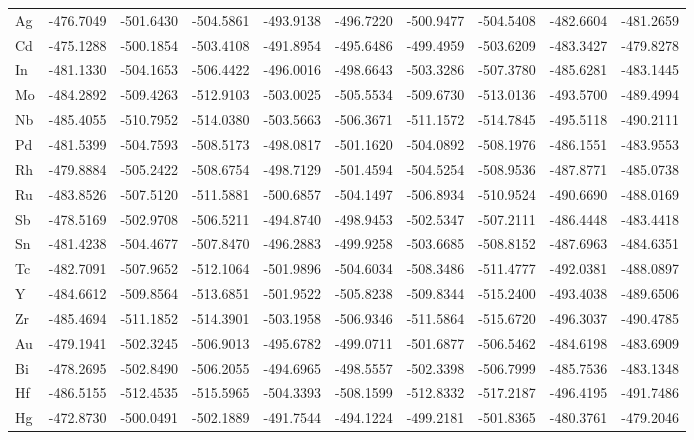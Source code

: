 \begin{table}[htbp]
{\begin{tabular}{l *{9}{l}}
      Ag & -476.7049 & -501.6430 & -504.5861 & -493.9138 & -496.7220 & -500.9477 & -504.5408 & -482.6604 & -481.2659 \\
      Cd & -475.1288 & -500.1854 & -503.4108 & -491.8954 & -495.6486 & -499.4959 & -503.6209 & -483.3427 & -479.8278 \\
      In & -481.1330 & -504.1653 & -506.4422 & -496.0016 & -498.6643 & -503.3286 & -507.3780 & -485.6281 & -483.1445 \\
      Mo & -484.2892 & -509.4263 & -512.9103 & -503.0025 & -505.5534 & -509.6730 & -513.0136 & -493.5700 & -489.4994 \\
      Nb & -485.4055 & -510.7952 & -514.0380 & -503.5663 & -506.3671 & -511.1572 & -514.7845 & -495.5118 & -490.2111 \\
      Pd & -481.5399 & -504.7593 & -508.5173 & -498.0817 & -501.1620 & -504.0892 & -508.1976 & -486.1551 & -483.9553 \\
      Rh & -479.8884 & -505.2422 & -508.6754 & -498.7129 & -501.4594 & -504.5254 & -508.9536 & -487.8771 & -485.0738 \\
      Ru & -483.8526 & -507.5120 & -511.5881 & -500.6857 & -504.1497 & -506.8934 & -510.9524 & -490.6690 & -488.0169 \\
      Sb & -478.5169 & -502.9708 & -506.5211 & -494.8740 & -498.9453 & -502.5347 & -507.2111 & -486.4448 & -483.4418 \\
      Sn & -481.4238 & -504.4677 & -507.8470 & -496.2883 & -499.9258 & -503.6685 & -508.8152 & -487.6963 & -484.6351 \\
      Tc & -482.7091 & -507.9652 & -512.1064 & -501.9896 & -504.6034 & -508.3486 & -511.4777 & -492.0381 & -488.0897 \\
      Y  & -484.6612 & -509.8564 & -513.6851 & -501.9522 & -505.8238 & -509.8344 & -515.2400 & -493.4038 & -489.6506 \\
      Zr & -485.4694 & -511.1852 & -514.3901 & -503.1958 & -506.9346 & -511.5864 & -515.6720 & -496.3037 & -490.4785 \\
      Au & -479.1941 & -502.3245 & -506.9013 & -495.6782 & -499.0711 & -501.6877 & -506.5462 & -484.6198 & -483.6909 \\
      Bi & -478.2695 & -502.8490 & -506.2055 & -494.6965 & -498.5557 & -502.3398 & -506.7999 & -485.7536 & -483.1348 \\
      Hf & -486.5155 & -512.4535 & -515.5965 & -504.3393 & -508.1599 & -512.8332 & -517.2187 & -496.4195 & -491.7486 \\
      Hg & -472.8730 & -500.0491 & -502.1889 & -491.7544 & -494.1224 & -499.2181 & -501.8365 & -480.3761 & -479.2046 \\

\end{tabular}}
\end{table}
